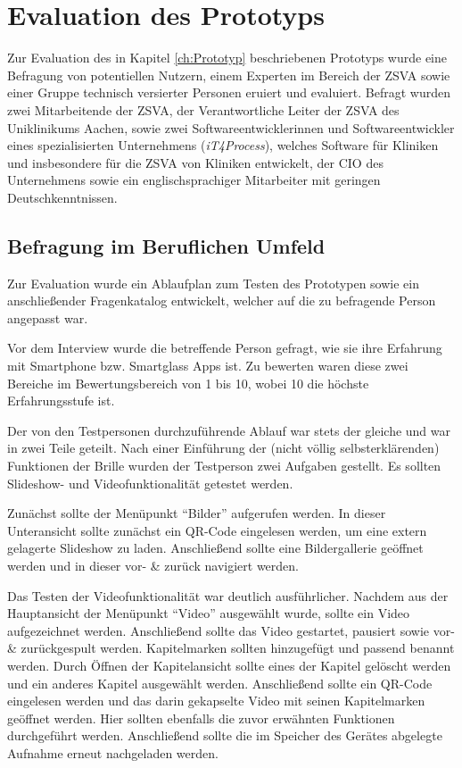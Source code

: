 %
%
%
%
%
%
\chapter{Evaluation des Prototyps}
\label{ch:Evaluation_des_Prototyps}
Zur Evaluation des in Kapitel \ref{ch:Prototyp} beschriebenen Prototyps wurde eine Befragung von potentiellen Nutzern, einem Experten im Bereich der ZSVA sowie einer Gruppe technisch versierter Personen eruiert und evaluiert. Befragt wurden zwei
Mitarbeitende der ZSVA, 
der Verantwortliche Leiter der ZSVA des Uniklinikums Aachen, 
sowie zwei Softwareentwicklerinnen und Softwareentwickler eines spezialisierten Unternehmens (\emph{iT4Process}), welches Software für Kliniken und insbesondere für die ZSVA von Kliniken entwickelt, der CIO des Unternehmens sowie ein englischsprachiger Mitarbeiter mit geringen Deutschkenntnissen.
%
%
%
%
%
%
%
\section{Befragung im Beruflichen Umfeld}
\label{sec:Befragung_im_Beruflichen_Umfeld}
Zur Evaluation wurde ein Ablaufplan zum Testen des Prototypen sowie ein anschließender Fragenkatalog entwickelt, welcher auf die zu befragende Person angepasst war. 

Vor dem Interview wurde die betreffende Person gefragt, wie sie ihre Erfahrung mit Smartphone bzw. Smartglass Apps ist. Zu bewerten waren diese zwei Bereiche im Bewertungsbereich von 1 bis 10, wobei 10 die höchste Erfahrungsstufe ist.

Der von den Testpersonen durchzuführende Ablauf war stets der gleiche und war in zwei Teile geteilt. Nach einer Einführung der (nicht völlig selbsterklärenden) Funktionen der Brille wurden der Testperson zwei Aufgaben gestellt. Es sollten Slideshow- und Videofunktionalität getestet werden. 

Zunächst sollte der Menüpunkt \enquote{Bilder} aufgerufen werden. In dieser Unteransicht sollte zunächst ein QR-Code eingelesen werden, um eine extern gelagerte Slideshow zu laden. Anschließend sollte eine Bildergallerie geöffnet werden und in dieser vor- \& zurück navigiert werden.

Das Testen der Videofunktionalität war deutlich ausführlicher. Nachdem aus der Hauptansicht der Menüpunkt \enquote{Video} ausgewählt wurde, sollte ein Video aufgezeichnet werden. Anschließend sollte das Video gestartet, pausiert sowie vor- \& zurückgespult werden. Kapitelmarken sollten hinzugefügt und passend benannt werden. Durch Öffnen der Kapitelansicht sollte eines der Kapitel gelöscht werden und ein anderes Kapitel ausgewählt werden. Anschließend sollte ein QR-Code eingelesen werden und das darin gekapselte Video mit seinen Kapitelmarken geöffnet werden. Hier sollten ebenfalls die zuvor erwähnten Funktionen durchgeführt werden. Anschließend sollte die im Speicher des Gerätes abgelegte Aufnahme erneut nachgeladen werden.

